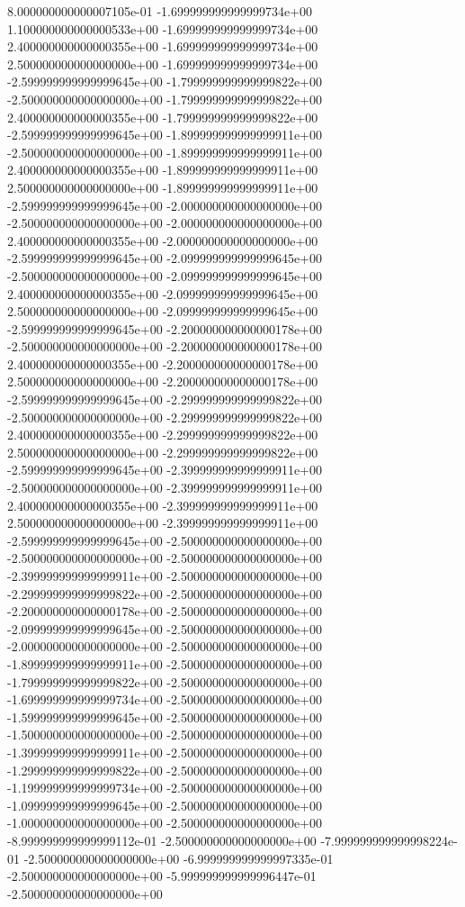 8.000000000000007105e-01 -1.699999999999999734e+00
1.100000000000000533e+00 -1.699999999999999734e+00
2.400000000000000355e+00 -1.699999999999999734e+00
2.500000000000000000e+00 -1.699999999999999734e+00
-2.599999999999999645e+00 -1.799999999999999822e+00
-2.500000000000000000e+00 -1.799999999999999822e+00
2.400000000000000355e+00 -1.799999999999999822e+00
-2.599999999999999645e+00 -1.899999999999999911e+00
-2.500000000000000000e+00 -1.899999999999999911e+00
2.400000000000000355e+00 -1.899999999999999911e+00
2.500000000000000000e+00 -1.899999999999999911e+00
-2.599999999999999645e+00 -2.000000000000000000e+00
-2.500000000000000000e+00 -2.000000000000000000e+00
2.400000000000000355e+00 -2.000000000000000000e+00
-2.599999999999999645e+00 -2.099999999999999645e+00
-2.500000000000000000e+00 -2.099999999999999645e+00
2.400000000000000355e+00 -2.099999999999999645e+00
2.500000000000000000e+00 -2.099999999999999645e+00
-2.599999999999999645e+00 -2.200000000000000178e+00
-2.500000000000000000e+00 -2.200000000000000178e+00
2.400000000000000355e+00 -2.200000000000000178e+00
2.500000000000000000e+00 -2.200000000000000178e+00
-2.599999999999999645e+00 -2.299999999999999822e+00
-2.500000000000000000e+00 -2.299999999999999822e+00
2.400000000000000355e+00 -2.299999999999999822e+00
2.500000000000000000e+00 -2.299999999999999822e+00
-2.599999999999999645e+00 -2.399999999999999911e+00
-2.500000000000000000e+00 -2.399999999999999911e+00
2.400000000000000355e+00 -2.399999999999999911e+00
2.500000000000000000e+00 -2.399999999999999911e+00
-2.599999999999999645e+00 -2.500000000000000000e+00
-2.500000000000000000e+00 -2.500000000000000000e+00
-2.399999999999999911e+00 -2.500000000000000000e+00
-2.299999999999999822e+00 -2.500000000000000000e+00
-2.200000000000000178e+00 -2.500000000000000000e+00
-2.099999999999999645e+00 -2.500000000000000000e+00
-2.000000000000000000e+00 -2.500000000000000000e+00
-1.899999999999999911e+00 -2.500000000000000000e+00
-1.799999999999999822e+00 -2.500000000000000000e+00
-1.699999999999999734e+00 -2.500000000000000000e+00
-1.599999999999999645e+00 -2.500000000000000000e+00
-1.500000000000000000e+00 -2.500000000000000000e+00
-1.399999999999999911e+00 -2.500000000000000000e+00
-1.299999999999999822e+00 -2.500000000000000000e+00
-1.199999999999999734e+00 -2.500000000000000000e+00
-1.099999999999999645e+00 -2.500000000000000000e+00
-1.000000000000000000e+00 -2.500000000000000000e+00
-8.999999999999999112e-01 -2.500000000000000000e+00
-7.999999999999998224e-01 -2.500000000000000000e+00
-6.999999999999997335e-01 -2.500000000000000000e+00
-5.999999999999996447e-01 -2.500000000000000000e+00
